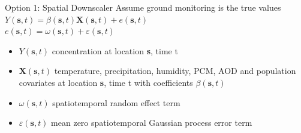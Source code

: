 Option 1: Spatial Downscaler
Assume ground monitoring is the true values\\
$ Y(\textbf{s},t) = \beta(\textbf{s},t) \textbf{X}(\textbf{s},t)  + e(\textbf{s},t) $\\
$ e(\textbf{s},t) = \omega(\textbf{s},t)  + \varepsilon(\textbf{s},t) $ \\
\begin{itemize}
 \item $Y(\textbf{s},t)$ concentration at location \textbf{s}, time t
 \item $\textbf{X}(\textbf{s},t)$ temperature, precipitation, humidity, PCM, AOD and population covariates at location \textbf{s}, time t with coefficients $\beta(\textbf{s},t)$
 \item $\omega(\textbf{s},t)$ spatiotemporal random effect term
 \item $\varepsilon(\textbf{s},t)$ mean zero spatiotemporal Gaussian process error term
\end{itemize}


